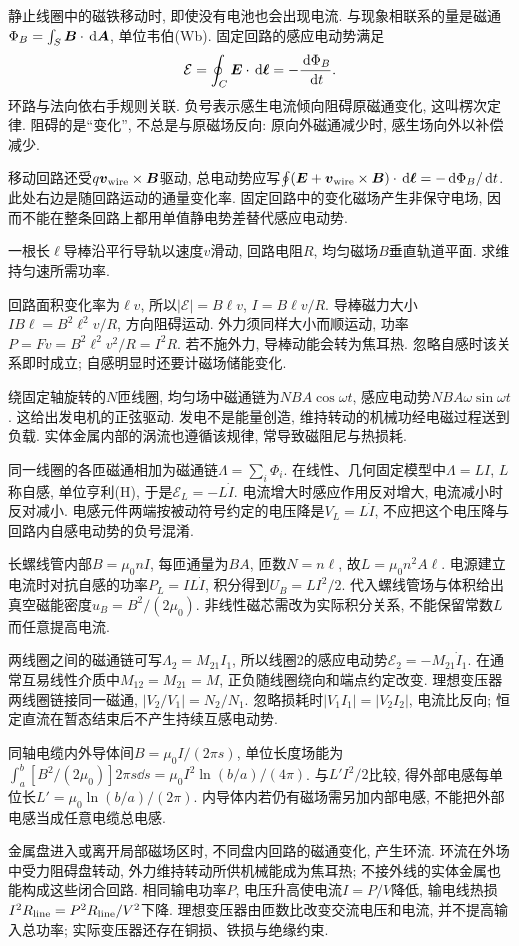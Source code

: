 \label{ch:induction}
静止线圈中的磁铁移动时, 即使没有电池也会出现电流. 与现象相联系的量是磁通$\Phi_B=\int_S\boldsymbol{B}\cdot\,\mathrm d\boldsymbol{A}$, 单位韦伯(Wb). 固定回路的感应电动势满足
\[
\mathcal E=\oint_C\boldsymbol{E}\cdot\,\mathrm d\boldsymbol{\ell}=-\frac{\,\mathrm d\Phi_B}{\,\mathrm d t}.
\]
环路与法向依右手规则关联. 负号表示感生电流倾向阻碍原磁通变化, 这叫楞次定律. 阻碍的是“变化”, 不总是与原磁场反向: 原向外磁通减少时, 感生场向外以补偿减少.

移动回路还受$q\boldsymbol{v}_{\rm wire}\times\boldsymbol{B}$驱动, 总电动势应写$\oint(\boldsymbol{E}+\boldsymbol{v}_{\rm wire}\times\boldsymbol{B})\cdot\,\mathrm d\boldsymbol{\ell}=-\,\mathrm d\Phi_B/\,\mathrm d t$. 此处右边是随回路运动的通量变化率. 固定回路中的变化磁场产生非保守电场, 因而不能在整条回路上都用单值静电势差替代感应电动势.

\begin{example}
一根长$\ell$导棒沿平行导轨以速度$v$滑动, 回路电阻$R$, 均匀磁场$B$垂直轨道平面. 求维持匀速所需功率.
\end{example}
\begin{solution}
回路面积变化率为$\ell v$, 所以$|\mathcal E|=B\ell v$, $I=B\ell v/R$. 导棒磁力大小$IB\ell=B^2\ell^2v/R$, 方向阻碍运动. 外力须同样大小而顺运动, 功率$P=Fv=B^2\ell^2v^2/R=I^2R$. 若不施外力, 导棒动能会转为焦耳热. 忽略自感时该关系即时成立; 自感明显时还要计磁场储能变化.
\end{solution}

绕固定轴旋转的$N$匝线圈, 均匀场中磁通链为$NBA\cos\omega t$, 感应电动势$NBA\omega\sin\omega t$. 这给出发电机的正弦驱动. 发电不是能量创造, 维持转动的机械功经电磁过程送到负载. 实体金属内部的涡流也遵循该规律, 常导致磁阻尼与热损耗.

同一线圈的各匝磁通相加为磁通链$\Lambda=\sum_i\Phi_i$. 在线性、几何固定模型中$\Lambda=LI$, $L$称自感, 单位亨利(H), 于是$\mathcal E_L=-L\dot I$. 电流增大时感应作用反对增大, 电流减小时反对减小. 电感元件两端按被动符号约定的电压降是$V_L=L\dot I$, 不应把这个电压降与回路内自感电动势的负号混淆.

长螺线管内部$B=\mu_0nI$, 每匝通量为$BA$, 匝数$N=n\ell$, 故$L=\mu_0n^2A\ell$. 电源建立电流时对抗自感的功率$P_L=IL\dot I$, 积分得到$U_B=LI^2/2$. 代入螺线管场与体积给出真空磁能密度$u_B=B^2/(2\mu_0)$. 非线性磁芯需改为实际积分关系, 不能保留常数$L$而任意提高电流.

两线圈之间的磁通链可写$\Lambda_2=M_{21}I_1$, 所以线圈2的感应电动势$\mathcal E_2=-M_{21}\dot I_1$. 在通常互易线性介质中$M_{12}=M_{21}=M$, 正负随线圈绕向和端点约定改变. 理想变压器两线圈链接同一磁通, $|V_2/V_1|=N_2/N_1$. 忽略损耗时$|V_1I_1|=|V_2I_2|$, 电流比反向; 恒定直流在暂态结束后不产生持续互感电动势.

同轴电缆内外导体间$B=\mu_0I/(2\pi s)$, 单位长度场能为$\int_a^b[B^2/(2\mu_0)]2\pi s\dd s=\mu_0I^2\ln(b/a)/(4\pi)$. 与$L'I^2/2$比较, 得外部电感每单位长$L'=\mu_0\ln(b/a)/(2\pi)$. 内导体内若仍有磁场需另加内部电感, 不能把外部电感当成任意电缆总电感.


金属盘进入或离开局部磁场区时, 不同盘内回路的磁通变化, 产生环流. 环流在外场中受力阻碍盘转动, 外力维持转动所供机械能成为焦耳热; 不接外线的实体金属也能构成这些闭合回路. 相同输电功率$P$, 电压升高使电流$I=P/V$降低, 输电线热损$I^2R_{\rm line}=P^2R_{\rm line}/V^2$下降. 理想变压器由匝数比改变交流电压和电流, 并不提高输入总功率; 实际变压器还存在铜损、铁损与绝缘约束.
